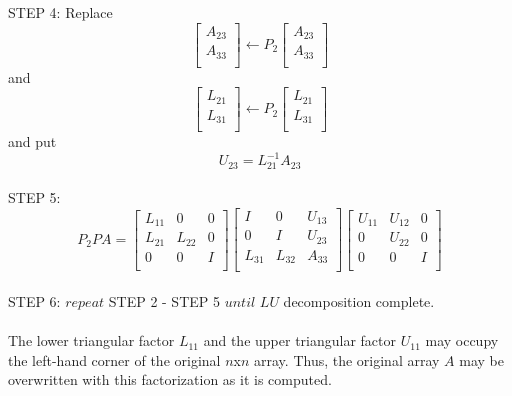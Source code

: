 STEP 4: Replace
\begin{equation}
\left[\begin{array}{l}
A_{23} \\
A_{33} \\
\end{array}\right] \leftarrow
P_{2}   
\left[\begin{array}{l}
A_{23} \\
A_{33}\\
\end{array}\right]
\end{equation}
and
\begin{equation}
\left[\begin{array}{l}
L_{21} \\
L_{31} \\
\end{array}\right] \leftarrow
P_{2}
\left[\begin{array}{l}
L_{21}\\
L_{31}\\
\end{array}\right]
\end{equation}
and put
\begin{equation}
U_{23} = L_{21}^{-1}A_{23}
\end{equation}\\
STEP 5: 
\begin{equation}
P_{2}PA=
\left[\begin{array}{lll}
L_{11} & 0 & 0\\
L_{21} & L_{22} & 0\\
0 & 0 & I\\
\end{array}\right]
\left[\begin{array}{lll}
I & 0 & U_{13}\\  
0 & I & U_{23}\\
L_{31} & L_{32} & A_{33}\\ 
\end{array}\right]
\left[\begin{array}{lll}
U_{11} & U_{12} & 0\\  
0 & U_{22} & 0\\
0 & 0 & I\\
\end{array}\right]
\end{equation}\\
STEP 6: $repeat$ STEP 2 - STEP 5 $until$ $LU$ decomposition complete.\\
\\
The lower triangular factor $L_{11}$ and the upper triangular factor $U_{11}$ may occupy the left-hand corner of the original $n$x$n$ array. Thus, the original
array $A$ may be overwritten with this factorization as it is computed.
